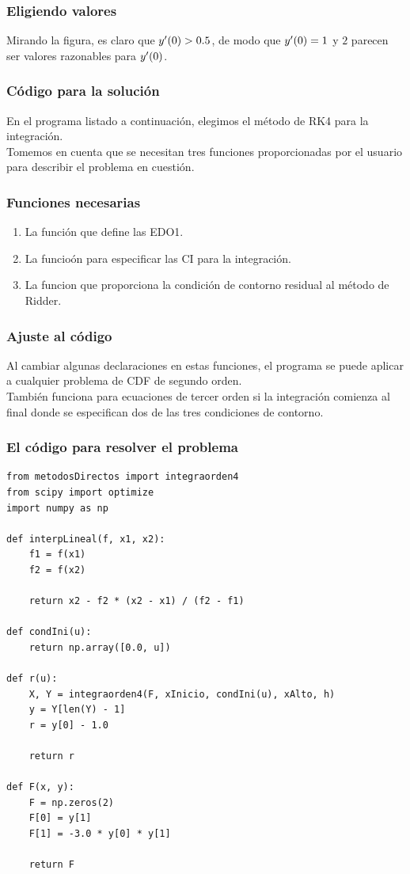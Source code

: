 \documentclass[12pt]{beamer}
\begin{document}
\begin{frame}
\frametitle{Eligiendo valores}
Mirando la figura, es claro que ${y}^{\prime} (0) > 0.5$, de modo que ${y}^{\prime} (0) = 1$ y $2$ parecen ser valores razonables para ${y}^{\prime} (0)$.
\end{frame}
\begin{frame}
\frametitle{Código para la solución}
En el programa listado a continuación, elegimos el método de RK4 para la integración.
\\
\bigskip
\pause
Tomemos en cuenta que se necesitan tres funciones proporcionadas por el usuario para describir el problema en cuestión.
\end{frame}
\begin{frame}
\frametitle{Funciones necesarias}
\begin{enumerate}[<+->]
\item La función  que define las EDO1.
\item La funcioón  para especificar las CI para la integración.
\item La funcion  que proporciona la condición de contorno residual al método de Ridder.
\end{enumerate}
\end{frame}
\begin{frame}
\frametitle{Ajuste al código}
Al cambiar algunas declaraciones en estas funciones, el programa se puede aplicar a cualquier problema de CDF de segundo orden.
\\
\bigskip
\pause
También funciona para ecuaciones de tercer orden si la integración comienza al final donde se especifican dos de las tres condiciones de contorno.
\end{frame}
\begin{frame}
\frametitle{El código para resolver el problema}
\begin{lstlisting}[caption=Declaración de funciones]
from metodosDirectos import integraorden4
from scipy import optimize
import numpy as np

def interpLineal(f, x1, x2):
    f1 = f(x1)
    f2 = f(x2)

    return x2 - f2 * (x2 - x1) / (f2 - f1)

def condIni(u):
    return np.array([0.0, u])

def r(u):
    X, Y = integraorden4(F, xInicio, condIni(u), xAlto, h)
    y = Y[len(Y) - 1]
    r = y[0] - 1.0
    
    return r

def F(x, y):
    F = np.zeros(2)
    F[0] = y[1]
    F[1] = -3.0 * y[0] * y[1]
    
    return F
\end{lstlisting}
\end{frame}
\end{document}
